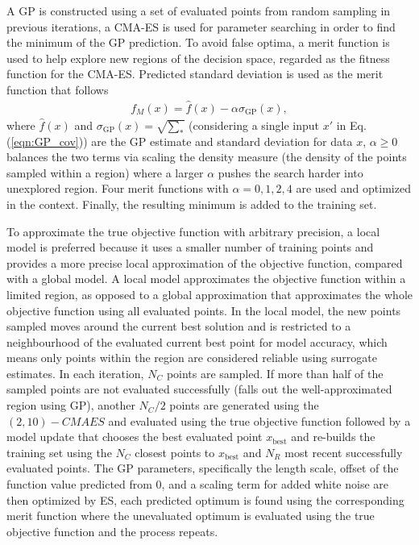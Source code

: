 A GP is constructed using a set of evaluated points from random sampling in previous iterations, a CMA-ES is used for parameter searching in order to find the minimum of the GP prediction. To avoid false optima, a merit function is used to help explore new regions of the decision space, regarded as the fitness function for the CMA-ES.   
Predicted standard deviation is used as the merit function that follows 
\begin{align}
f_M (x) = \hat f(x) - \alpha \sigma_{\text{GP}} (x),
\end{align}
where $\hat f(x)$ and $\sigma_{\text{GP}} (x)=\sqrt{\sum_*}$ (considering a single input $x \prime$ in Eq. (\ref{eqn:GP_cov})) are the GP estimate and standard deviation for data $x$, $\alpha \geq 0$ balances the two terms via scaling the density measure (the density of the points sampled within a region) where a larger $\alpha$ pushes the search harder into unexplored region. Four merit functions with $\alpha =0,1,2,4$ are used and optimized in the context. Finally, the resulting minimum is added to the training set.

To approximate the true objective function with arbitrary precision, a local model is preferred because it uses a smaller number of training points and provides a more precise local approximation of the objective function, compared with a global model. A local model approximates the objective function within a limited region, as opposed to a global approximation that approximates the whole objective function using all evaluated points. In the local model, the new points sampled moves around the current best solution and is restricted to a neighbourhood of the evaluated current best point for model accuracy, which means only points within the region are considered reliable using surrogate estimates. In each iteration, $N_C$ points are sampled. If more than half of the sampled points are not evaluated successfully (falls out the well-approximated region using GP), another $N_C/2$ points are generated using the $(2,10)-CMAES$ and evaluated using the true objective function followed by a model update that chooses the best evaluated point $x_{\text{best}}$ and re-builds the training set using the $N_C$ closest points to $x_{\text{best}}$ and $N_R$ most recent successfully evaluated points. The GP parameters, specifically the length scale, offset of the function value predicted from 0, and a scaling term for added white noise are then optimized by ES, each predicted optimum is found using the corresponding merit function where the unevaluated optimum is evaluated using the true objective function and the process repeats.

